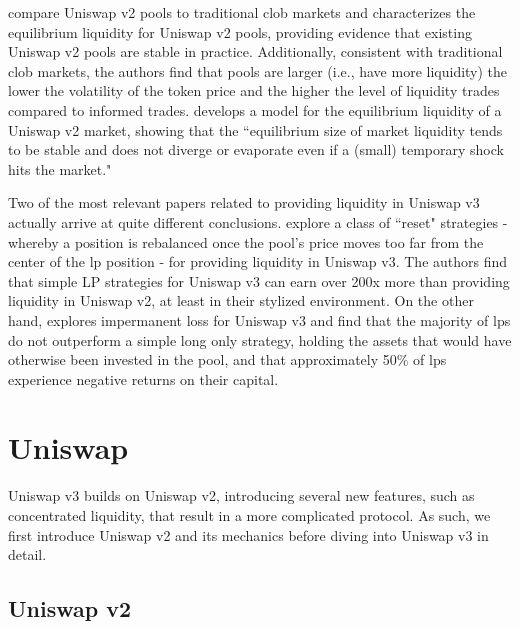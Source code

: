 \documentclass[11pt]{article}
\begin{document}
\citet{Lehar2021DecentralizedE} compare Uniswap v2 pools to traditional \gls{clob} markets and characterizes the equilibrium liquidity for Uniswap v2 pools, providing evidence that existing Uniswap v2 pools are stable in practice. Additionally, consistent with traditional \gls{clob} markets, the authors find that pools are larger (i.e., have more liquidity) the lower the volatility of the token price and the higher the level of liquidity trades compared to informed trades. \citet{Aoyagi2020LiquidityPB} develops a model for the equilibrium liquidity of a Uniswap v2 market, showing that the ``equilibrium size of market liquidity tends to be stable and does not diverge or evaporate even if a (small) temporary shock hits the market."

Two of the most relevant papers related to providing liquidity in Uniswap v3 actually arrive at quite different conclusions. \citet{neuder2021strategic} explore a class of ``reset" strategies - whereby a position is rebalanced once the pool's price moves too far from the center of the \gls{lp} position - for providing liquidity in Uniswap v3. The authors find that simple LP strategies for Uniswap v3 can earn over 200x more than providing liquidity in Uniswap v2, at least in their stylized environment. On the other hand, \citet{loesch2021impermanent} explores impermanent loss for Uniswap v3 and find that the majority of \glspl{lp} do not outperform a simple long only strategy, holding the assets that would have otherwise been invested in the pool, and that approximately 50\% of \glspl{lp} experience negative returns on their capital.

\section{Uniswap}\label{sec:2}

Uniswap v3 builds on Uniswap v2, introducing several new features, such as concentrated liquidity, that result in a more complicated protocol. As such, we first introduce Uniswap v2 and its mechanics before diving into Uniswap v3 in detail.

\subsection{Uniswap v2}
\end{document}
